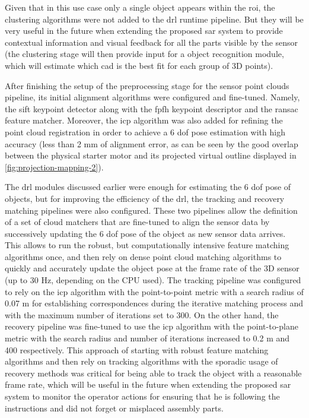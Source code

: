 Given that in this use case only a single object appears within the \gls{roi}, the clustering algorithms were not added to the drl runtime pipeline. But they will be very useful in the future when extending the proposed \gls{sar} system to provide contextual information and visual feedback for all the parts visible by the sensor (the clustering stage will then provide input for a object recognition module, which will estimate which \gls{cad} is the best fit for each group of 3D points).

After finishing the setup of the preprocessing stage for the sensor point clouds pipeline, its initial alignment algorithms were configured and fine-tuned. Namely, the \gls{sift} keypoint detector along with the \gls{fpfh} keypoint descriptor and the \gls{ransac} feature matcher. Moreover, the \gls{icp} algorithm was also added for refining the point cloud registration in order to achieve a 6 \gls{dof} pose estimation with high accuracy (less than 2 mm of alignment error, as can be seen by the good overlap between the physical starter motor and its projected virtual outline displayed in \cref{fig:projection-mapping-2}).

The drl modules discussed earlier were enough for estimating the 6 \gls{dof} pose of objects, but for improving the efficiency of the drl, the tracking and recovery matching pipelines were also configured. These two pipelines allow the definition of a set of cloud matchers that are fine-tuned to align the sensor data by successively updating the 6 \gls{dof} pose of the object as new sensor data arrives. This allows to run the robust, but computationally intensive feature matching algorithms once, and then rely on dense point cloud matching algorithms to quickly and accurately update the object pose at the frame rate of the 3D sensor (up to 30 Hz, depending on the CPU used). The tracking pipeline was configured to rely on the \gls{icp} algorithm with the point-to-point metric with a search radius of 0.07 m for establishing correspondences during the iterative matching process and with the maximum number of iterations set to 300. On the other hand, the recovery pipeline was fine-tuned to use the \gls{icp} algorithm with the point-to-plane metric with the search radius and number of iterations increased to 0.2 m and 400 respectively. This approach of starting with robust feature matching algorithms and then rely on tracking algorithms with the sporadic usage of recovery methods was critical for being able to track the object with a reasonable frame rate, which will be useful in the future when extending the proposed \gls{sar} system to monitor the operator actions for ensuring that he is following the instructions and did not forget or misplaced assembly parts.

